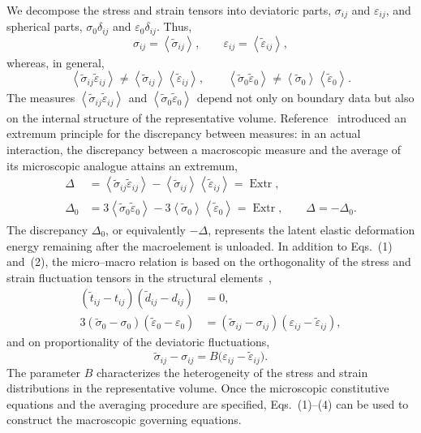 \documentclass[11pt,a4paper]{article}
\numberwithin{equation}{section}
\newcommand{\avg}[2][]{\left\langle #2\right\rangle_{#1}}
\newcommand{\Extr}{\operatorname{Extr}}
\begin{document}
We decompose the stress and strain tensors into deviatoric parts, $\sigma_{ij}$ and $\varepsilon_{ij}$, and spherical parts, $\sigma_0\delta_{ij}$ and $\varepsilon_0\delta_{ij}$. Thus,
\[
 \sigma_{ij}=\avg{\widetilde\sigma_{ij}},\qquad
 \varepsilon_{ij}=\avg{\widetilde\varepsilon_{ij}},
\]
whereas, in general,
\[
 \avg{\widetilde\sigma_{ij}\widetilde\varepsilon_{ij}}
 \ne \avg{\widetilde\sigma_{ij}}\avg{\widetilde\varepsilon_{ij}},
 \qquad
 \avg{\widetilde\sigma_0\widetilde\varepsilon_0}
 \ne \avg{\widetilde\sigma_0}\avg{\widetilde\varepsilon_0}.
\]
The measures $\avg{\widetilde\sigma_{ij}\widetilde\varepsilon_{ij}}$ and $\avg{\widetilde\sigma_0\widetilde\varepsilon_0}$ depend not only on boundary data but also on the internal structure of the representative volume. Reference~\cite{marina2024} introduced an extremum principle for the discrepancy between measures: in an actual interaction, the discrepancy between a macroscopic measure and the average of its microscopic analogue attains an extremum,
\begin{equation}
\begin{aligned}
 \Delta
 &=\avg{\widetilde\sigma_{ij}\widetilde\varepsilon_{ij}}
   -\avg{\widetilde\sigma_{ij}}\avg{\widetilde\varepsilon_{ij}}
   =\Extr,\\
 \Delta_0
 &=3\avg{\widetilde\sigma_0\widetilde\varepsilon_0}
   -3\avg{\widetilde\sigma_0}\avg{\widetilde\varepsilon_0}
   =\Extr,
 \qquad \Delta=-\Delta_0.
\end{aligned}
\end{equation}
The discrepancy $\Delta_0$, or equivalently $-\Delta$, represents the latent elastic deformation energy remaining after the macroelement is unloaded. In addition to Eqs.~(1) and~(2), the micro--macro relation is based on the orthogonality of the stress and strain fluctuation tensors in the structural elements~\cite{marina2024,marina1997},
\begin{equation}
\begin{aligned}
 (\widetilde t_{ij}-t_{ij})(\widetilde d_{ij}-d_{ij})&=0,\\
 3(\widetilde\sigma_0-\sigma_0)(\widetilde\varepsilon_0-\varepsilon_0)
 &= (\widetilde\sigma_{ij}-\sigma_{ij})
    (\varepsilon_{ij}-\widetilde\varepsilon_{ij}),
\end{aligned}
\end{equation}
and on proportionality of the deviatoric fluctuations,
\begin{equation}
 \widetilde\sigma_{ij}-\sigma_{ij}
 =B\bigl(\varepsilon_{ij}-\widetilde\varepsilon_{ij}\bigr).
\end{equation}
The parameter $B$ characterizes the heterogeneity of the stress and strain distributions in the representative volume. Once the microscopic constitutive equations and the averaging procedure are specified, Eqs.~(1)--(4) can be used to construct the macroscopic governing equations.
\end{document}

